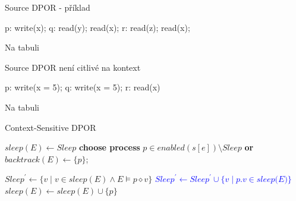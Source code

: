 \documentclass[11pt]{beamer}
\begin{document}
\begin{frame}[fragile]{Source DPOR - příklad}
\begin{semiverbatim}
p: write(x);
q: read(y); read(x);
r: read(z); read(x);
\end{semiverbatim}
\pause
Na tabuli
\end{frame}

\begin{frame}[fragile]{Source DPOR není citlivé na kontext}
\begin{semiverbatim}
p: write(x = 5);
q: write(x = 5);
r: read(x)
\end{semiverbatim}
\pause
Na tabuli
\end{frame}




%
\begin{frame}[fragile]{Context-Sensitive DPOR}

\begin{algorithmic} \small
  \State $sleep(E) \gets Sleep$
  \State \textbf{choose process} $p \in \textit{enabled}(s[e]) \setminus \textit{Sleep}$
  \textbf{or} \Return
  \State $\textit{backtrack}(E) \gets \{ p \}$;
  
    \State {}
  
    \State $\textit{Sleep}^\prime \gets \{ v \mid v \in \textit{sleep}(E) \land E \vDash p \diamond v \}$
    \State \textcolor{blue}{$\textit{Sleep}^\prime \gets \textit{Sleep}^\prime \cup \{ v \mid p.v \in \textit{sleep(E)} \}$}
    \State {}
    \State $\textit{sleep}(E) \gets \textit{sleep}(E) \cup \{ p \}$


  \EndWhile  
\EndFunction
\end{algorithmic}
\end{frame}
\end{document}
